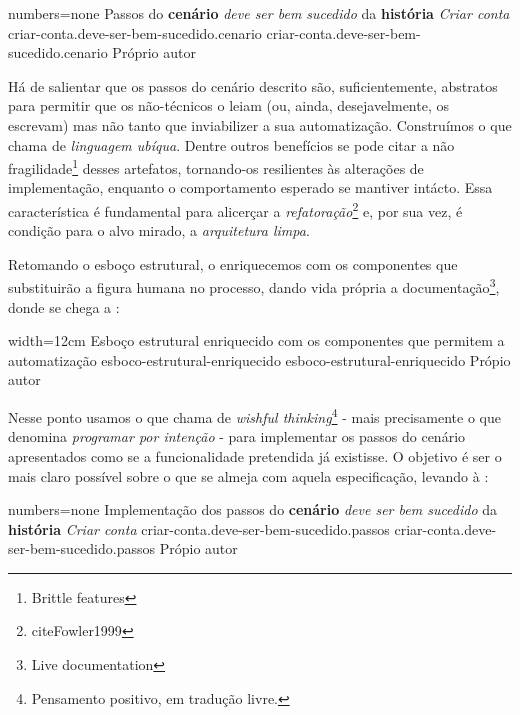     \codigo
      {numbers=none}
      {Passos do \textbf{cenário} \emph{deve ser bem sucedido} da \textbf{história} \emph{Criar conta}}
      {criar-conta.deve-ser-bem-sucedido.cenario}
      {criar-conta.deve-ser-bem-sucedido.cenario}
      {Próprio autor}

  Há de salientar que os passos do cenário descrito são, suficientemente, abstratos para permitir que os não-técnicos o leiam (ou, ainda, desejavelmente, os escrevam) mas não tanto que inviabilizer a sua automatização. Construímos o que  chama de \emph{linguagem ubíqua}. Dentre outros benefícios se pode citar a não fragilidade\footnote{\cite[pág. 93]{RoseWynneHellesoy2015} Brittle features} desses artefatos, tornando-os resilientes às alterações de implementação, enquanto o comportamento esperado se mantiver intácto. Essa característica é fundamental para alicerçar a \emph{refatoração}\footnote{cite{Fowler1999}} e, por sua vez, é condição para o alvo mirado, a \emph{arquitetura limpa}.

  Retomando o esboço estrutural, o enriquecemos com os componentes que substituirão a figura humana no processo, dando vida própria a documentação\footnote{ Live documentation}, donde se chega a :

  \imagem
    {width=12cm}
    {Esboço estrutural enriquecido com os componentes que permitem a automatização}
    {esboco-estrutural-enriquecido}
    {esboco-estrutural-enriquecido}
    {Própio autor}

  Nesse ponto usamos o que  chama de \emph{wishful thinking}\footnote{Pensamento positivo, em tradução livre.} - mais precisamente o que  denomina \emph{programar por intenção} - para implementar os passos do cenário apresentados como se a funcionalidade pretendida já existisse. O objetivo é ser o mais claro possível sobre o que se almeja com aquela especificação, levando à :

  \codigo
    {numbers=none}
    {Implementação dos passos do \textbf{cenário} \emph{deve ser bem sucedido} da \textbf{história} \emph{Criar conta}}
    {criar-conta.deve-ser-bem-sucedido.passos}
    {criar-conta.deve-ser-bem-sucedido.passos}
    {Própio autor}

